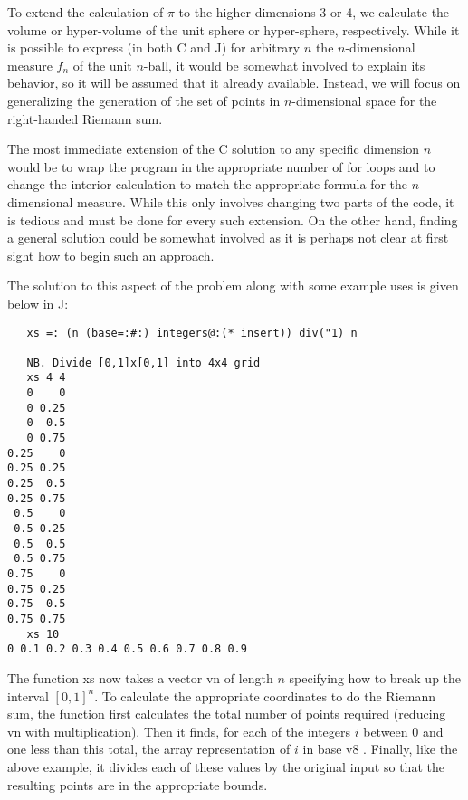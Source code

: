 To extend the calculation of $\pi$ to the higher dimensions 3 or 4, 
we calculate the volume or hyper-volume of the unit sphere or hyper-sphere, respectively.
While it is possible to express (in both C and J) for arbitrary $n$ the $n$-dimensional measure $f_n$ of the unit $n$-ball, 
it would be somewhat involved to explain its behavior, so it will be assumed that it already available.
Instead, we will focus on generalizing the generation of 
the set of points in $n$-dimensional space for the right-handed Riemann sum.

The most immediate extension of the C solution to any specific dimension $n$
would be to wrap the program in the appropriate number of for loops 
and to change the interior calculation to match the appropriate formula for the $n$-dimensional measure.
While this only involves changing two parts of the code, it is tedious 
and must be done for every such extension. 
On the other hand, finding a general solution could be somewhat involved 
as it is perhaps not clear at first sight how to begin such an approach.

The solution to this aspect of the problem along with some example uses is given below in J:

\begin{singlespacing}
\begin{small}
\begin{verbatim}
   xs =: (n (base=:#:) integers@:(* insert)) div("1) n

   NB. Divide [0,1]x[0,1] into 4x4 grid
   xs 4 4
   0    0
   0 0.25
   0  0.5
   0 0.75
0.25    0
0.25 0.25
0.25  0.5
0.25 0.75
 0.5    0
 0.5 0.25
 0.5  0.5
 0.5 0.75
0.75    0
0.75 0.25
0.75  0.5
0.75 0.75
   xs 10
0 0.1 0.2 0.3 0.4 0.5 0.6 0.7 0.8 0.9
\end{verbatim}
\end{small}
\end{singlespacing}

The function \ttfamily xs \normalfont now takes a vector \ttfamily vn \normalfont of length $n$ 
specifying how to break up the interval $[0,1]^n$.
To calculate the appropriate coordinates to do the Riemann sum, 
the function first calculates the total number of points required (reducing \ttfamily vn \normalfont with multiplication). 
Then it finds, for each of the integers $i$ between 0 and one less than this total, 
the array representation of $i$ in base \ttfamily v8 \normalfont. 
Finally, like the above example, it divides each of these values by the original input 
so that the resulting points are in the appropriate bounds.

